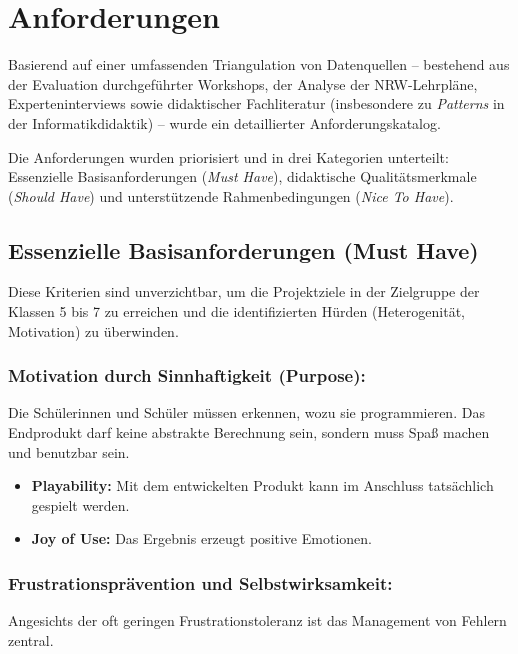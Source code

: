 \documentclass[a5paper,pagesize,10pt,bibtotoc,pointlessnumbers,
normalheadings,DIV=9,twoside=false]{scrbook}
\begin{document}
\section*{Anforderungen}

Basierend auf einer umfassenden Triangulation von Datenquellen -- bestehend aus der Evaluation durchgeführter Workshops, der Analyse der NRW-Lehrpläne, Experteninterviews sowie didaktischer Fachliteratur (insbesondere zu \textit{Patterns} in der Informatikdidaktik) -- wurde ein detaillierter Anforderungskatalog.

Die Anforderungen wurden priorisiert und in drei Kategorien unterteilt: Essenzielle Basisanforderungen (\textit{Must Have}), didaktische Qualitätsmerkmale (\textit{Should Have}) und unterstützende Rahmenbedingungen (\textit{Nice To Have}).

\subsection*{Essenzielle Basisanforderungen (Must Have)}

Diese Kriterien sind unverzichtbar, um die Projektziele in der Zielgruppe der Klassen 5 bis 7 zu erreichen und die identifizierten Hürden (Heterogenität, Motivation) zu überwinden.

\subsubsection{Motivation durch Sinnhaftigkeit (Purpose):}

Die Schülerinnen und Schüler müssen erkennen, wozu sie programmieren. Das Endprodukt darf keine abstrakte Berechnung sein, sondern muss Spaß machen und benutzbar sein.

\begin{itemize}
    \item \textbf{Playability:} Mit dem entwickelten Produkt kann im Anschluss tatsächlich gespielt werden.
    \item \textbf{Joy of Use:} Das Ergebnis erzeugt positive Emotionen.
\end{itemize}

\subsubsection{Frustrationsprävention und Selbstwirksamkeit:}
    
Angesichts der oft geringen Frustrationstoleranz ist das Management von Fehlern zentral.
\end{document}
